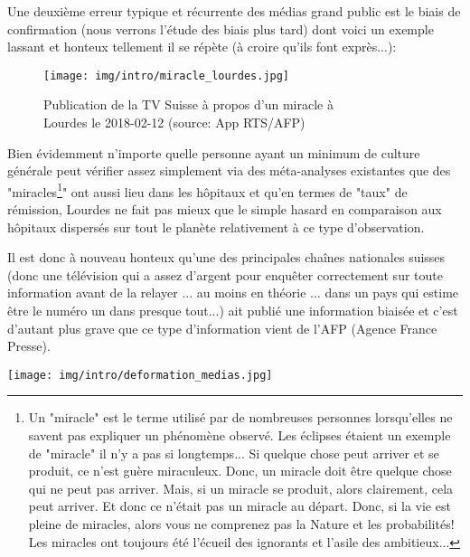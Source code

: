	Une deuxième erreur typique et r\'ecurrente des m\'edias grand public est le biais de confirmation (nous verrons l'\'etude des biais plus tard) dont voici un exemple lassant et honteux tellement il se r\'epète (à croire qu'ils font exprès...):
	\begin{figure}[H]
		\centering
		\texttt{[image: img/intro/miracle\_lourdes.jpg]}
		\caption[Publication de la T\'el\'evision Suisse sur un miracle à Lourdes]{Publication de la TV Suisse à propos d'un miracle à\\ Lourdes le 2018-02-12 (source: App RTS/AFP)}
	\end{figure}
	Bien \'evidemment n'importe quelle personne ayant un minimum de culture g\'en\'erale peut v\'erifier assez simplement via des m\'eta-analyses existantes que des "miracles\footnote{Un "miracle" est le terme utilis\'e par de nombreuses personnes lorsqu'elles ne savent pas expliquer un ph\'enomène observ\'e. Les \'eclipses \'etaient un exemple de "miracle" il n'y a pas si longtemps... Si quelque chose peut arriver et se produit, ce n'est guère miraculeux. Donc, un miracle doit être quelque chose qui ne peut pas arriver. Mais, si un miracle se produit, alors clairement, cela peut arriver. Et donc ce n'était pas un miracle au départ. Donc, si la vie est pleine de miracles, alors vous ne comprenez pas la Nature et les probabilités! Les miracles ont toujours été l'écueil des ignorants et l'asile des ambitieux...}" ont aussi lieu dans les hôpitaux et qu'en termes de "taux" de r\'emission, Lourdes ne fait pas mieux que le simple hasard en comparaison aux hôpitaux dispers\'es sur tout le planète relativement à ce type d'observation.
	
	Il est donc à nouveau honteux qu'une des principales chaînes nationales suisses (donc une t\'el\'evision qui a assez d'argent pour enquêter correctement sur toute information avant de la relayer ... au moins en th\'eorie ... dans un pays qui estime être le num\'ero un dans presque tout...) ait publi\'e une information biais\'ee et c'est d'autant plus grave que ce type d'information vient de l'AFP (Agence France Presse).
	
	\begin{center}
		\texttt{[image: img/intro/deformation\_medias.jpg]}
	\end{center}

